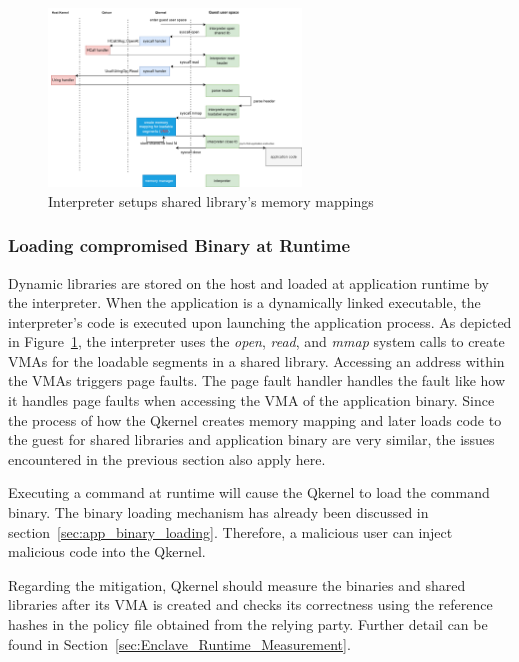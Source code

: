 \begin{figure}[htp]
  \centering
  \includegraphics[width=0.6\textwidth]{images/load_shared_libarart.png}
  \caption[Interpreter setups shared library's memory mappings]{Interpreter setups shared library's memory mappings}
  \label{fig:load_shared_libarart}
\end{figure}


\subsubsection{Loading compromised Binary at Runtime}
Dynamic libraries are stored on the host and loaded at application runtime by the interpreter. When the application is a dynamically linked executable, the interpreter's code is executed upon launching the application process. As depicted in Figure~\ref{fig:load_shared_libarart}, the interpreter uses the \emph{open}, \emph{read}, and \emph{mmap} 
system calls to create \acrshort{VMA}s for the loadable segments in a shared library. Accessing an address within the \acrshort{VMA}s triggers page faults. The page fault handler handles the fault like how it handles page faults when accessing the \acrshort{VMA} of the application binary.
Since the process of how the Qkernel creates memory mapping and later loads code to the guest for shared libraries and application binary are very similar, the issues encountered in the previous section also apply here. 
 
Executing a command at runtime will cause the Qkernel to load the command binary. The binary loading mechanism has already been discussed in section~\ref{sec:app_binary_loading}. Therefore, a malicious user can inject malicious code into the Qkernel. 
 
Regarding the mitigation, Qkernel should measure the binaries and shared libraries after its \acrshort{VMA} is created and checks its correctness using the reference hashes in the policy file obtained from the relying party. Further detail can be found in Section~\ref{sec:Enclave_Runtime_Measurement}. 


